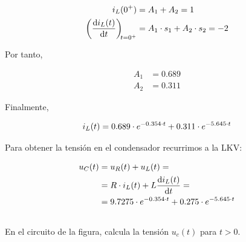 \documentclass[12pt]{article}
\begin{document}
\begin{align*}
  i_L(0^+) &= A_1 + A_2 = 1\\
  \diff{i_L(t)}{t}[t = 0^+] &= A_1 \cdot s_1 + A_2 \cdot s_2 = -2
\end{align*}

Por tanto,

\begin{align*}
  A_1 &= 0.689\\
  A_2 &= 0.311
\end{align*}

Finalmente,

\begin{equation*}
  i_L(t) = 0.689 \cdot e^{-0.354 \cdot t} + 0.311 \cdot e^{-5.645 \cdot t}\\
\end{equation*}

Para obtener la tensión en el condensador recurrimos a la LKV:

\begin{align*}
  u_C(t) &= u_R(t) + u_L(t) = \\
         &= R \cdot i_L(t) + L \diff{i_L(t)}{t} = \\
         &= 9.7275 \cdot e^{-0.354 \cdot t} + 0.275 \cdot e^{-5.645 \cdot t}
\end{align*}

\clearpage

\subsection{}

En el circuito de la figura, calcula la tensión $u_c(t)$ para $t > 0$.

\vspace*{1cm}
\end{document}
